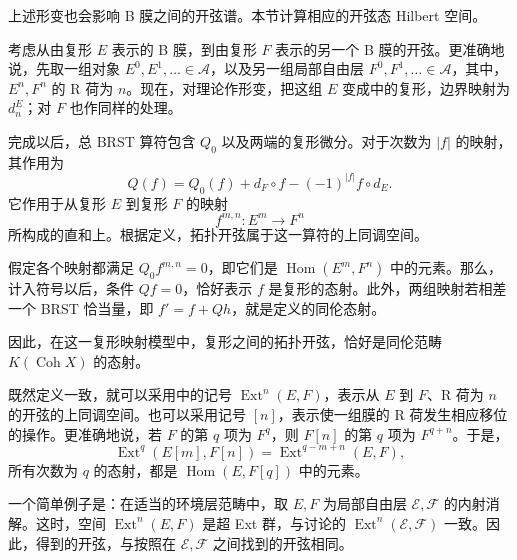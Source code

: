 上述形变也会影响 B 膜之间的开弦谱。本节计算相应的开弦态 Hilbert 空间。

考虑从由复形 $E$ 表示的 B 膜，到由复形 $F$ 表示的另一个 B 膜的开弦。更准确地说，先取一组对象 $E^0,E^1,\ldots\in\mathcal{A}$，以及另一组局部自由层 $F^0,F^1,\ldots\in\mathcal{A}$，其中，$E^n,F^n$ 的 R 荷为 $n$。现在，对理论作形变，把这组 $E$ 变成中的复形，边界映射为 $d_n^E$；对 $F$ 也作同样的处理。

完成以后，总 BRST 算符包含 $Q_0$ 以及两端的复形微分。对于次数为 $|f|$ 的映射，其作用为
\begin{equation}\label{eq:5.51}
Q(f)=Q_0(f)+d_F\circ f-(-1)^{|f|}f\circ d_E.
\end{equation}
它作用于从复形 $E$ 到复形 $F$ 的映射
\[
f^{m,n}\colon E^m\longrightarrow F^n
\]
所构成的直和上。根据定义，拓扑开弦属于这一算符的上同调空间。

假定各个映射都满足 $Q_0f^{m,n}=0$，即它们是 $\operatorname{Hom}(E^m,F^n)$ 中的元素。那么，计入符号以后，条件 $Qf=0$，恰好表示 $f$ 是复形的态射。此外，两组映射若相差一个 BRST 恰当量，即 $f'=f+Qh$，就是定义的同伦态射。

因此，在这一复形映射模型中，复形之间的拓扑开弦，恰好是同伦范畴 $K(\operatorname{Coh}X)$ 的态射。

既然定义一致，就可以采用中的记号 $\operatorname{Ext}^n(E,F)$，表示从 $E$ 到 $F$、R 荷为 $n$ 的开弦的上同调空间。也可以采用记号 $[n]$，表示使一组膜的 R 荷发生相应移位的操作。更准确地说，若 $F$ 的第 $q$ 项为 $F^q$，则 $F[n]$ 的第 $q$ 项为 $F^{q+n}$。于是，
\begin{equation}\label{eq:5.52}
\operatorname{Ext}^q(E[m],F[n])
=\operatorname{Ext}^{q-m+n}(E,F),
\end{equation}
所有次数为 $q$ 的态射，都是 $\operatorname{Hom}(E,F[q])$ 中的元素。

\begin{example*}
一个简单例子是：在适当的环境层范畴中，取 $E,F$ 为局部自由层 $\mathcal{E},\mathcal{F}$ 的内射消解。这时，空间 $\operatorname{Ext}^n(E,F)$ 是超 Ext 群，与讨论的 $\operatorname{Ext}^n(\mathcal{E},\mathcal{F})$ 一致。因此，得到的开弦，与按照在 $\mathcal{E},\mathcal{F}$ 之间找到的开弦相同。
\end{example*}

